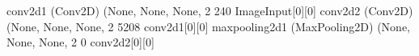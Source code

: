 \documentclass[letterpaper,10pt,english]{sphinxmanual}
\begin{document}
\begin{sphinxVerbatim}[commandchars=\\\{\}]
conv2d\PYGZus{}1 (Conv2D)               (None, None, None, 2 240         Image\PYGZus{}Input[0][0]                
\PYGZus{}\PYGZus{}\PYGZus{}\PYGZus{}\PYGZus{}\PYGZus{}\PYGZus{}\PYGZus{}\PYGZus{}\PYGZus{}\PYGZus{}\PYGZus{}\PYGZus{}\PYGZus{}\PYGZus{}\PYGZus{}\PYGZus{}\PYGZus{}\PYGZus{}\PYGZus{}\PYGZus{}\PYGZus{}\PYGZus{}\PYGZus{}\PYGZus{}\PYGZus{}\PYGZus{}\PYGZus{}\PYGZus{}\PYGZus{}\PYGZus{}\PYGZus{}\PYGZus{}\PYGZus{}\PYGZus{}\PYGZus{}\PYGZus{}\PYGZus{}\PYGZus{}\PYGZus{}\PYGZus{}\PYGZus{}\PYGZus{}\PYGZus{}\PYGZus{}\PYGZus{}\PYGZus{}\PYGZus{}\PYGZus{}\PYGZus{}\PYGZus{}\PYGZus{}\PYGZus{}\PYGZus{}\PYGZus{}\PYGZus{}\PYGZus{}\PYGZus{}\PYGZus{}\PYGZus{}\PYGZus{}\PYGZus{}\PYGZus{}\PYGZus{}\PYGZus{}\PYGZus{}\PYGZus{}\PYGZus{}\PYGZus{}\PYGZus{}\PYGZus{}\PYGZus{}\PYGZus{}\PYGZus{}\PYGZus{}\PYGZus{}\PYGZus{}\PYGZus{}\PYGZus{}\PYGZus{}\PYGZus{}\PYGZus{}\PYGZus{}\PYGZus{}\PYGZus{}\PYGZus{}\PYGZus{}\PYGZus{}\PYGZus{}\PYGZus{}\PYGZus{}\PYGZus{}\PYGZus{}\PYGZus{}\PYGZus{}\PYGZus{}\PYGZus{}\PYGZus{}
conv2d\PYGZus{}2 (Conv2D)               (None, None, None, 2 5208        conv2d\PYGZus{}1[0][0]                   
\PYGZus{}\PYGZus{}\PYGZus{}\PYGZus{}\PYGZus{}\PYGZus{}\PYGZus{}\PYGZus{}\PYGZus{}\PYGZus{}\PYGZus{}\PYGZus{}\PYGZus{}\PYGZus{}\PYGZus{}\PYGZus{}\PYGZus{}\PYGZus{}\PYGZus{}\PYGZus{}\PYGZus{}\PYGZus{}\PYGZus{}\PYGZus{}\PYGZus{}\PYGZus{}\PYGZus{}\PYGZus{}\PYGZus{}\PYGZus{}\PYGZus{}\PYGZus{}\PYGZus{}\PYGZus{}\PYGZus{}\PYGZus{}\PYGZus{}\PYGZus{}\PYGZus{}\PYGZus{}\PYGZus{}\PYGZus{}\PYGZus{}\PYGZus{}\PYGZus{}\PYGZus{}\PYGZus{}\PYGZus{}\PYGZus{}\PYGZus{}\PYGZus{}\PYGZus{}\PYGZus{}\PYGZus{}\PYGZus{}\PYGZus{}\PYGZus{}\PYGZus{}\PYGZus{}\PYGZus{}\PYGZus{}\PYGZus{}\PYGZus{}\PYGZus{}\PYGZus{}\PYGZus{}\PYGZus{}\PYGZus{}\PYGZus{}\PYGZus{}\PYGZus{}\PYGZus{}\PYGZus{}\PYGZus{}\PYGZus{}\PYGZus{}\PYGZus{}\PYGZus{}\PYGZus{}\PYGZus{}\PYGZus{}\PYGZus{}\PYGZus{}\PYGZus{}\PYGZus{}\PYGZus{}\PYGZus{}\PYGZus{}\PYGZus{}\PYGZus{}\PYGZus{}\PYGZus{}\PYGZus{}\PYGZus{}\PYGZus{}\PYGZus{}\PYGZus{}\PYGZus{}
max\PYGZus{}pooling2d\PYGZus{}1 (MaxPooling2D)  (None, None, None, 2 0           conv2d\PYGZus{}2[0][0]                   
\PYGZus{}\PYGZus{}\PYGZus{}\PYGZus{}\PYGZus{}\PYGZus{}\PYGZus{}\PYGZus{}\PYGZus{}\PYGZus{}\PYGZus{}\PYGZus{}\PYGZus{}\PYGZus{}\PYGZus{}\PYGZus{}\PYGZus{}\PYGZus{}\PYGZus{}\PYGZus{}\PYGZus{}\PYGZus{}\PYGZus{}\PYGZus{}\PYGZus{}\PYGZus{}\PYGZus{}\PYGZus{}\PYGZus{}\PYGZus{}\PYGZus{}\PYGZus{}\PYGZus{}\PYGZus{}\PYGZus{}\PYGZus{}\PYGZus{}\PYGZus{}\PYGZus{}\PYGZus{}\PYGZus{}\PYGZus{}\PYGZus{}\PYGZus{}\PYGZus{}\PYGZus{}\PYGZus{}\PYGZus{}\PYGZus{}\PYGZus{}\PYGZus{}\PYGZus{}\PYGZus{}\PYGZus{}\PYGZus{}\PYGZus{}\PYGZus{}\PYGZus{}\PYGZus{}\PYGZus{}\PYGZus{}\PYGZus{}\PYGZus{}\PYGZus{}\PYGZus{}\PYGZus{}\PYGZus{}\PYGZus{}\PYGZus{}\PYGZus{}\PYGZus{}\PYGZus{}\PYGZus{}\PYGZus{}\PYGZus{}\PYGZus{}\PYGZus{}\PYGZus{}\PYGZus{}\PYGZus{}\PYGZus{}\PYGZus{}\PYGZus{}\PYGZus{}\PYGZus{}\PYGZus{}\PYGZus{}\PYGZus{}\PYGZus{}\PYGZus{}\PYGZus{}\PYGZus{}\PYGZus{}\PYGZus{}\PYGZus{}\PYGZus{}\PYGZus{}\PYGZus{}

\end{sphinxVerbatim}
\end{document}
